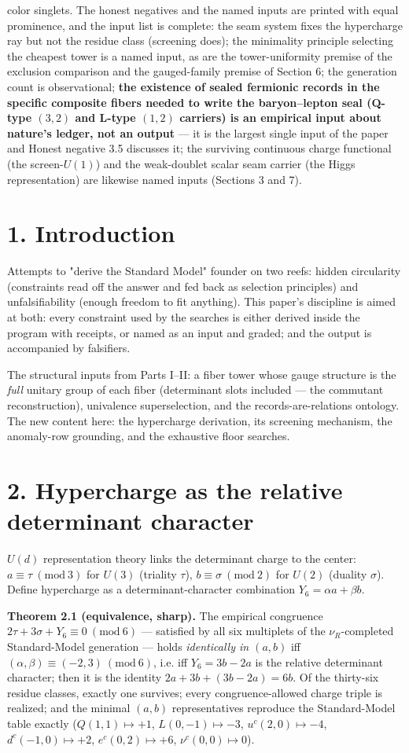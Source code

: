 \documentclass[11pt]{article}
\begin{document}
color singlets.  The honest negatives and the named inputs are printed with equal prominence, and the input list is complete: the seam system fixes the hypercharge ray but not the residue class (screening does); the minimality principle selecting the cheapest tower is a named input, as are the tower-uniformity premise of the exclusion comparison and the gauged-family premise of Section 6; the generation count is observational; \textbf{the existence of sealed fermionic records in the specific composite fibers needed to write the baryon–lepton seal (Q-type $(3,2)$ and L-type $(1,2)$ carriers) is an empirical input about nature's ledger, not an output} — it is the largest single input of the paper and Honest negative 3.5 discusses it; the surviving continuous charge functional (the screen-$U(1)$) and the weak-doublet scalar seam carrier (the Higgs representation) are likewise named inputs (Sections 3 and 7).

\section*{1. Introduction}
Attempts to "derive the Standard Model" founder on two reefs: hidden circularity (constraints read off the answer and fed back as selection principles) and unfalsifiability (enough freedom to fit anything).  This paper's discipline is aimed at both: every constraint used by the searches is either derived inside the program with receipts, or named as an input and graded; and the output is accompanied by falsifiers.

The structural inputs from Parts I–II: a fiber tower whose gauge structure is the \emph{full} unitary group of each fiber (determinant slots included — the commutant reconstruction), univalence superselection, and the records-are-relations ontology.  The new content here: the hypercharge derivation, its screening mechanism, the anomaly-row grounding, and the exhaustive floor searches.

\section*{2. Hypercharge as the relative determinant character}
$U(d)$ representation theory links the determinant charge to the center: $a \equiv \tau \ (\mathrm{mod}\ 3)$ for $U(3)$ (triality $\tau$), $b \equiv \sigma\ (\mathrm{mod}\ 2)$ for $U(2)$ (duality $\sigma$).  Define hypercharge as a determinant-character combination $Y_6 = \alpha a + \beta b$.

\textbf{Theorem 2.1 (equivalence, sharp).}  The empirical congruence $2\tau + 3\sigma + Y_6 \equiv 0 \ (\mathrm{mod}\ 6)$ — satisfied by all six multiplets of the $\nu_R$-completed Standard-Model generation — holds \emph{identically in $(a,b)$} iff $(\alpha, \beta) \equiv (-2, 3) \ (\mathrm{mod}\ 6)$, i.e. iff $Y_6 = 3b - 2a$ is the relative determinant character; then it is the identity $2a + 3b + (3b - 2a) = 6b$.  Of the thirty-six residue classes, exactly one survives; every congruence-allowed charge triple is realized; and the minimal $(a,b)$ representatives reproduce the Standard-Model table exactly ($Q(1,1)\mapsto +1$, $L(0,-1)\mapsto -3$, $u^c(2,0)\mapsto -4$, $d^c(-1,0)\mapsto +2$, $e^c(0,2)\mapsto +6$, $\nu^c(0,0)\mapsto 0$).
\end{document}
